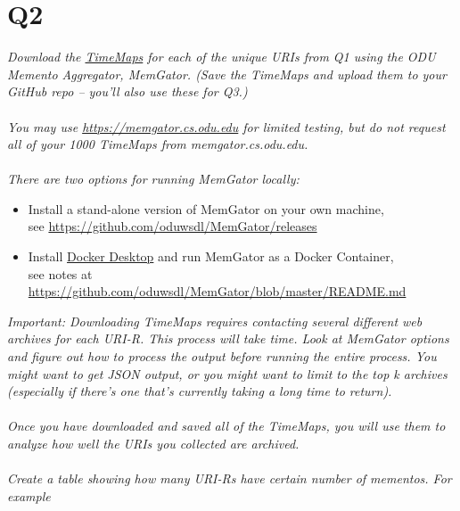\documentclass[12pt]{article}
\begin{document}
\section*{Q2}
\emph{Download the \href{http://www.mementoweb.org/guide/quick-intro/}{TimeMaps} for each of the unique URIs from Q1 using the ODU Memento Aggregator, MemGator. (Save the TimeMaps and upload them to your GitHub repo -- you'll also use these for Q3.) \\ \\
You may use \href{https://memgator.cs.odu.edu/}{https://memgator.cs.odu.edu} for limited testing, but do not request all of your 1000 TimeMaps from memgator.cs.odu.edu. \\ \\
There are two options for running MemGator locally:}
\begin{itemize}
    \item Install a stand-alone version of MemGator on your own machine, \\see \href{https://github.com/oduwsdl/MemGator/releases}{https://github.com/oduwsdl/MemGator/releases}

    \item Install \href{https://www.docker.com/products/docker-desktop}{Docker Desktop} and run MemGator as a Docker Container, \\see notes at \href{https://github.com/oduwsdl/MemGator/blob/master/README.md}{https://github.com/oduwsdl/MemGator/blob/master/README.md}
\end{itemize}

\emph{Important: Downloading TimeMaps requires contacting several different web archives for each URI-R. This process will take time. Look at MemGator options and figure out how to process the output before running the entire process. You might want to get JSON output, or you might want to limit to the top k archives (especially if there's one that's currently taking a long time to return). \\ \\
Once you have downloaded and saved all of the TimeMaps, you will use them to analyze how well the URIs you collected are archived.
\\ \\
Create a table showing how many URI-Rs have certain number of mementos. For example}
\end{document}
